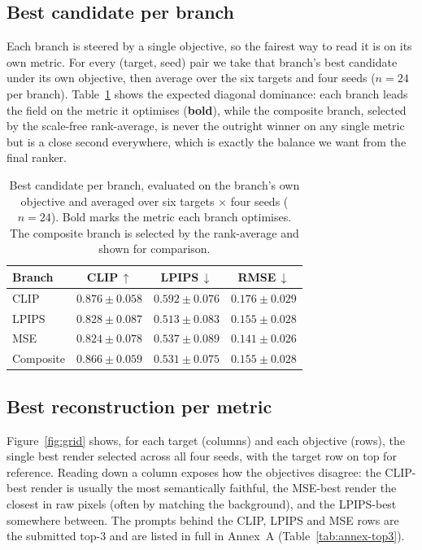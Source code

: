 \documentclass[runningheads]{llncs}
\begin{document}
\subsection{Best candidate per branch}
Each branch is steered by a single objective, so the fairest way to read it is on its own metric. For every (target, seed) pair we take that branch's best candidate under its own objective, then average over the six targets and four seeds ($n{=}24$ per branch). Table~\ref{tab:perbranch} shows the expected diagonal dominance: each branch leads the field on the metric it optimises (\textbf{bold}), while the composite branch, selected by the scale-free rank-average, is never the outright winner on any single metric but is a close second everywhere, which is exactly the balance we want from the final ranker.

\begin{table}[H]
\centering
\caption{Best candidate per branch, evaluated on the branch's own objective and averaged over six targets $\times$ four seeds ($n{=}24$). Bold marks the metric each branch optimises. The composite branch is selected by the rank-average and shown for comparison.}
\label{tab:perbranch}
\small
\begin{tabular}{l c c c}
\toprule
\textbf{Branch} & \textbf{CLIP\,$\uparrow$} & \textbf{LPIPS\,$\downarrow$} & \textbf{RMSE\,$\downarrow$} \\
\midrule
CLIP & $\mathbf{0.876\pm0.058}$ & $0.592\pm0.076$ & $0.176\pm0.029$ \\
LPIPS & $0.828\pm0.087$ & $\mathbf{0.513\pm0.083}$ & $0.155\pm0.028$ \\
MSE & $0.824\pm0.078$ & $0.537\pm0.089$ & $\mathbf{0.141\pm0.026}$ \\
Composite & $0.866\pm0.059$ & $0.531\pm0.075$ & $0.155\pm0.028$ \\
\bottomrule
\end{tabular}
\end{table}

\subsection{Best reconstruction per metric}
Figure~\ref{fig:grid} shows, for each target (columns) and each objective (rows), the single best render selected across all four seeds, with the target row on top for reference. Reading down a column exposes how the objectives disagree: the CLIP-best render is usually the most semantically faithful, the MSE-best render the closest in raw pixels (often by matching the background), and the LPIPS-best somewhere between. The prompts behind the CLIP, LPIPS and MSE rows are the submitted top-3 and are listed in full in Annex~A (Table~\ref{tab:annex-top3}).
\end{document}
